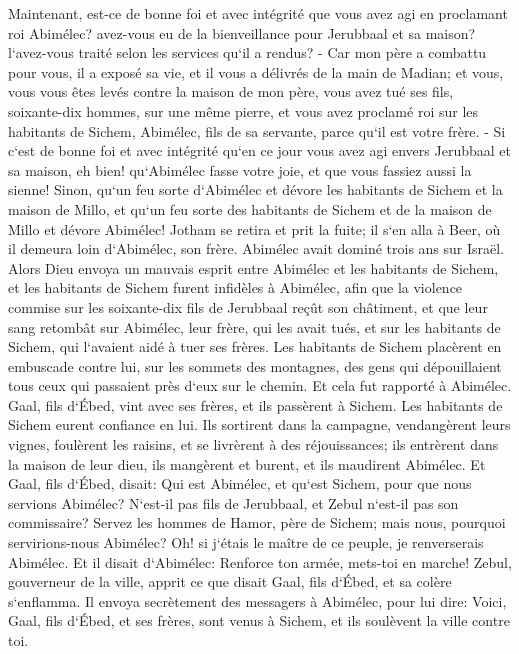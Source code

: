 \verse Maintenant, est-ce de bonne foi et avec intégrité que vous avez agi en proclamant roi Abimélec? avez-vous eu de la bienveillance pour Jerubbaal et sa maison? l`avez-vous traité selon les services qu`il a rendus? - 
\verse Car mon père a combattu pour vous, il a exposé sa vie, et il vous a délivrés de la main de Madian; 
\verse et vous, vous vous êtes levés contre la maison de mon père, vous avez tué ses fils, soixante-dix hommes, sur une même pierre, et vous avez proclamé roi sur les habitants de Sichem, Abimélec, fils de sa servante, parce qu`il est votre frère. - 
\verse Si c`est de bonne foi et avec intégrité qu`en ce jour vous avez agi envers Jerubbaal et sa maison, eh bien! qu`Abimélec fasse votre joie, et que vous fassiez aussi la sienne! 
\verse Sinon, qu`un feu sorte d`Abimélec et dévore les habitants de Sichem et la maison de Millo, et qu`un feu sorte des habitants de Sichem et de la maison de Millo et dévore Abimélec! 
\verse Jotham se retira et prit la fuite; il s`en alla à Beer, où il demeura loin d`Abimélec, son frère. 
\verse Abimélec avait dominé trois ans sur Israël. 
\verse Alors Dieu envoya un mauvais esprit entre Abimélec et les habitants de Sichem, et les habitants de Sichem furent infidèles à Abimélec, 
\verse afin que la violence commise sur les soixante-dix fils de Jerubbaal reçût son châtiment, et que leur sang retombât sur Abimélec, leur frère, qui les avait tués, et sur les habitants de Sichem, qui l`avaient aidé à tuer ses frères. 
\verse Les habitants de Sichem placèrent en embuscade contre lui, sur les sommets des montagnes, des gens qui dépouillaient tous ceux qui passaient près d`eux sur le chemin. Et cela fut rapporté à Abimélec. 
\verse Gaal, fils d`Ébed, vint avec ses frères, et ils passèrent à Sichem. Les habitants de Sichem eurent confiance en lui. 
\verse Ils sortirent dans la campagne, vendangèrent leurs vignes, foulèrent les raisins, et se livrèrent à des réjouissances; ils entrèrent dans la maison de leur dieu, ils mangèrent et burent, et ils maudirent Abimélec. 
\verse Et Gaal, fils d`Ébed, disait: Qui est Abimélec, et qu`est Sichem, pour que nous servions Abimélec? N`est-il pas fils de Jerubbaal, et Zebul n`est-il pas son commissaire? Servez les hommes de Hamor, père de Sichem; mais nous, pourquoi servirions-nous Abimélec? 
\verse Oh! si j`étais le maître de ce peuple, je renverserais Abimélec. Et il disait d`Abimélec: Renforce ton armée, mets-toi en marche! 
\verse Zebul, gouverneur de la ville, apprit ce que disait Gaal, fils d`Ébed, et sa colère s`enflamma. 
\verse Il envoya secrètement des messagers à Abimélec, pour lui dire: Voici, Gaal, fils d`Ébed, et ses frères, sont venus à Sichem, et ils soulèvent la ville contre toi. 
